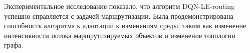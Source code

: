 \documentclass[specification,annotation,times]{itmo-student-thesis}
\theoremstyle{definition}
\begin{document}





\chapterconclusion

Экспериментальное исследование показало, что алгоритм DQN-LE-routing успешно
справляется с задачей маршрутизации. Была продемонстрирована способность
алгоритма к адаптации к изменениям среды, таким как изменение интенсивности
потока маршрутизируемых объектов и изменение топологии графа.
\end{document}
